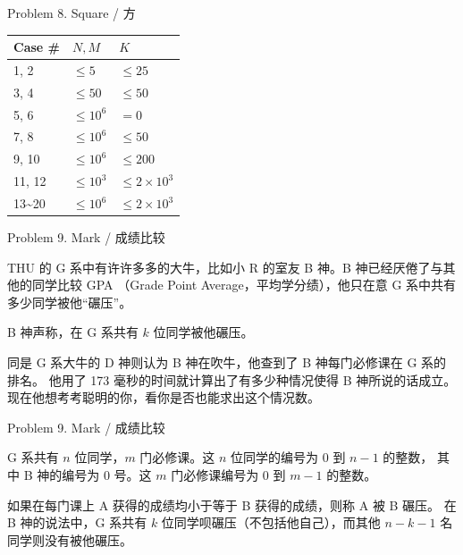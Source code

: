 \documentclass[UTF8]{beamer}
\begin{document}
\begin{frame}{Problem 8. Square / 方}

\begin{tabularx}{\textwidth}{X|X|X} \hline
Case \# & $N, M$ & $K$ \\ \hline \hline
1, 2   & $\leq 5$    & $\leq 25$            \\ \hline
3, 4   & $\leq 50$   & $\leq 50$            \\ \hline
5, 6   & $\leq 10^6$ & $= 0$                \\ \hline
7, 8   & $\leq 10^6$ & $\leq 50$            \\ \hline
9, 10  & $\leq 10^6$ & $\leq 200$           \\ \hline
11, 12 & $\leq 10^3$ & $\leq 2 \times 10^3$ \\ \hline
13\textasciitilde 20 & $\leq 10^6$ & $\leq 2 \times 10^3$ \\ \hline
\end{tabularx}

\end{frame}


\begin{frame}{Problem 9. Mark / 成绩比较}

THU 的 G 系中有许许多多的大牛，比如小 R 的室友 B 神。B 神已经厌倦了与其他的同学比较 GPA
（Grade Point Average，平均学分绩），他只在意 G 系中共有多少同学被他“碾压”。

B 神声称，在 G 系共有 $k$ 位同学被他碾压。

同是 G 系大牛的 D 神则认为 B 神在吹牛，他查到了 B 神每门必修课在 G 系的排名。
他用了 173 毫秒的时间就计算出了有多少种情况使得 B 神所说的话成立。
现在他想考考聪明的你，看你是否也能求出这个情况数。

\end{frame}

\begin{frame}{Problem 9. Mark / 成绩比较}

G 系共有 $n$ 位同学，$m$ 门必修课。这 $n$ 位同学的编号为 0 到 $n - 1$ 的整数，
其中 B 神的编号为 0 号。这 $m$ 门必修课编号为 0 到 $m - 1$ 的整数。

如果在每门课上 A 获得的成绩均小于等于 B 获得的成绩，则称 A 被 B 碾压。
在 B 神的说法中，G 系共有 $k$ 位同学呗碾压（不包括他自己），而其他 $n - k - 1$
名同学则没有被他碾压。

\end{frame}
\end{document}
